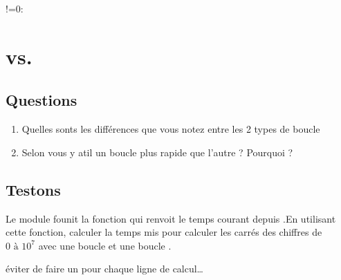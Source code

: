 \documentclass[letterpaper,10pt,english]{sphinxmanual}
\begin{document}

\begin{sphinxVerbatim}[commandchars=\\\{\}]
   
     !=0:
\end{sphinxVerbatim}


\section{ vs. }
\label{\detokenize{src/OCI04_Boucles:for-vs-while}}

\subsection{Questions}
\label{\detokenize{src/OCI04_Boucles:questions}}\begin{enumerate}
%
\item {} 
Quelles sonts les différences que vous notez entre les 2 types de boucle

\item {} 
Selon vous y a\sphinxhyphen{}t\sphinxhyphen{}il un boucle plus rapide que l’autre ? Pourquoi ?

\end{enumerate}



\subsection{Testons}
\label{\detokenize{src/OCI04_Boucles:testons}}
Le module  founit la fonction  qui renvoit le temps courant depuis .En utilisant cette fonction, calculer la temps mis pour calculer les carrés des chiffres de \(0 \text{ à } 10^7\) avec une boucle  et une boucle .

 éviter de faire un  pour chaque ligne de calcul…
\end{document}
